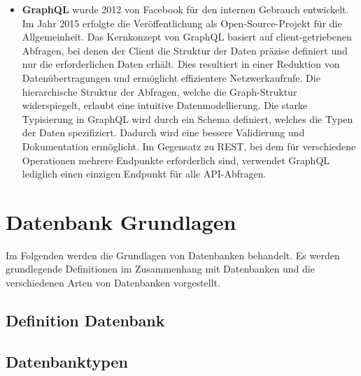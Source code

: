 \begin{itemize}
	\item \textbf{GraphQL} wurde 2012 von Facebook für den internen Gebrauch entwickelt. Im Jahr 2015 erfolgte die Veröffentlichung als Open-Source-Projekt für die Allgemeinheit. Das Kernkonzept von GraphQL basiert auf client-getriebenen Abfragen, bei denen der Client die Struktur der Daten präzise definiert und nur die erforderlichen Daten erhält. Dies resultiert in einer Reduktion von Datenübertragungen und ermöglicht effizientere Netzwerkaufrufe. Die hierarchische Struktur der Abfragen, welche die Graph-Struktur widerspiegelt, erlaubt eine intuitive Datenmodellierung. Die starke Typisierung in GraphQL wird durch ein Schema definiert, welches die Typen der Daten spezifiziert. Dadurch wird eine bessere Validierung und Dokumentation ermöglicht. Im Gegensatz zu REST, bei dem für verschiedene Operationen mehrere Endpunkte erforderlich sind, verwendet GraphQL lediglich einen einzigen Endpunkt für alle API-Abfragen.  \citep{graphqlreplacerest}

\end{itemize}


\newpage
\section{Datenbank Grundlagen} %
\label{sec:datenbankGrundlagen}
Im Folgenden werden die Grundlagen von Datenbanken behandelt. Es werden grundlegende Definitionen im Zusammenhang mit Datenbanken und die verschiedenen Arten von Datenbanken vorgestellt.
\subsection{Definition Datenbank} %
\label{sec:definitiondatenbank}

\subsection{Datenbanktypen} %
\label{sec:datenbanktypen}



